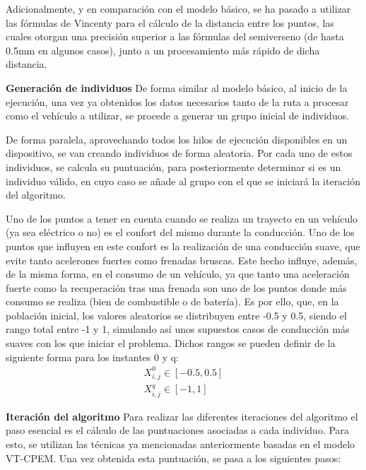 \documentclass[11pt,spanish,listoffigures,listoftables]{tfgetsinf}
\begin{document}
Adicionalmente, y en comparación con el modelo básico, se ha pasado a utilizar las fórmulas de Vincenty para el cálculo de la distancia entre los puntos, las cuales otorgan una precisión superior a las fórmulas del semiverseno (de hasta 0.5mm en algunos casos), junto a un procesamiento más rápido de dicha distancia.

\noindent\textbf{Generación de individuos}\newline
De forma similar al modelo básico, al inicio de la ejecución, una vez ya obtenidos los datos necesarios tanto de la ruta a procesar como el vehículo a utilizar, se procede a generar un grupo inicial de individuos.

De forma paralela, aprovechando todos los hilos de ejecución disponibles en un dispositivo, se van creando individuos de forma aleatoria. Por cada uno de estos individuos, se calcula su puntuación, para posteriormente determinar si es un individuo válido, en cuyo caso se añade al grupo con el que se iniciará la iteración del algoritmo.

Uno de los puntos a tener en cuenta cuando se realiza un trayecto en un vehículo (ya sea eléctrico o no) es el confort del mismo durante la conducción. Uno de los puntos que influyen en este confort es la realización de una conducción suave, que evite tanto acelerones fuertes como frenadas bruscas. Este hecho influye, además, de la misma forma, en el consumo de un vehículo, ya que tanto una aceleración fuerte como la recuperación tras una frenada son uno de los puntos donde más consumo se realiza (bien de combustible o de batería). Es por ello, que, en la población inicial, los valores aleatorios se distribuyen entre -0.5 y 0.5, siendo el rango total entre -1 y 1, simulando así unos supuestos casos de conducción más suaves con los que iniciar el problema. Dichos rangos se pueden definir de la siguiente forma para los instantes 0 y q:
\begin{align*}
    X_{i,j}^{0} \in [-0.5, 0.5] \\
    X_{i,j}^{q} \in [-1, 1]
\end{align*}

\noindent\textbf{Iteración del algoritmo}\newline
Para realizar las diferentes iteraciones del algoritmo el paso esencial es el cálculo de las puntuaciones asociadas a cada individuo. Para esto, se utilizan las técnicas ya mencionadas anteriormente basadas en el modelo VT-CPEM. Una vez obtenida esta puntuación, se pasa a los siguientes pasos:
\end{document}
